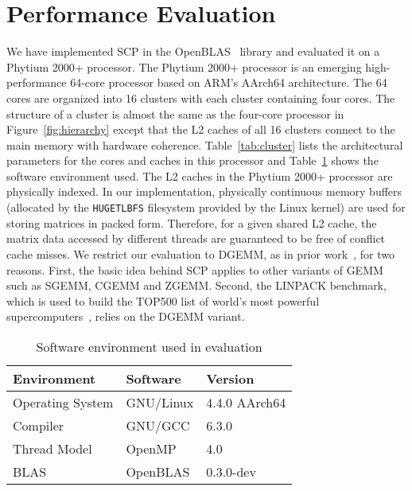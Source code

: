 \section{Performance Evaluation}\label{sec:evaluation}

We have implemented SCP in the OpenBLAS~\cite{openblas} library
and evaluated it on a Phytium 2000+ processor.
The Phytium 2000+ processor is an emerging high-performance
64-core processor based on ARM's AArch64 architecture.
The 64 cores are organized into 16 clusters with each
cluster containing four cores.
The structure of a cluster is almost the same as
the four-core processor in Figure~\ref{fig:hierarchy}
except that the L2 caches of all 16 clusters connect to the main memory
with hardware coherence.
Table~\ref{tab:cluster} lists the
architectural parameters for the cores and caches
in this processor
and Table~\ref{tab:software} shows the software environment used.
The L2 caches in the Phytium 2000+ processor are physically indexed.
In our implementation, physically continuous
memory buffers (allocated by the \texttt{HUGETLBFS} filesystem
provided by the Linux kernel) are used for storing
matrices in packed form. Therefore,
for a given shared L2 cache,
the matrix data accessed by different threads 
are guaranteed to be free of conflict cache misses.
We restrict our evaluation to DGEMM,
as in prior work~\cite{blispar,augem,poetmicro}, for two reasons.
First, the basic idea behind SCP applies to other
variants of GEMM such as SGEMM, CGEMM and ZGEMM.
Second, the LINPACK benchmark, which is used to build the
TOP500 list of world's most powerful supercomputers~\cite{top500},
relies on the DGEMM variant.

\begin{table}
  \centering
  \caption{Software environment used in evaluation}
  \label{tab:software}
  \begin{tabular}{lll}
    \toprule
    Environment & Software & Version \\
    \midrule
    Operating System & GNU/Linux & 4.4.0 AArch64 \\
    Compiler & GNU/GCC & 6.3.0 \\
    Thread Model & OpenMP & 4.0 \\
    BLAS & OpenBLAS & 0.3.0-dev \\
    \bottomrule
  \end{tabular}
\end{table}


